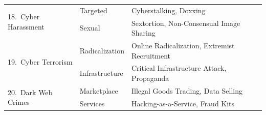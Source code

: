 \begin{table}[t]
\begin{tabular}{|l|l|p{7.5cm}|}
\multirow{2}{*}{18.\ Cyber Harassment}
  & Targeted            & Cyberstalking, Doxxing \\
  & Sexual              & Sextortion, Non-Consensual Image Sharing \\
\hline

\multirow{2}{*}{19.\ Cyber Terrorism}
  & Radicalization      & Online Radicalization, Extremist Recruitment \\
  & Infrastructure      & Critical Infrastructure Attack, Propaganda \\
\hline

\multirow{2}{*}{20.\ Dark Web Crimes}
  & Marketplace         & Illegal Goods Trading, Data Selling \\
  & Services            & Hacking-as-a-Service, Fraud Kits \\
\hline

\end{tabular}
\label{tab:taxonomy_50}
\end{table}
